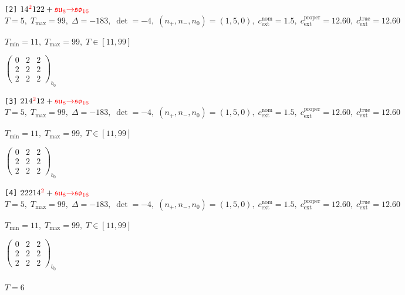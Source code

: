 \documentclass[10pt]{article}
\begin{document}
\texttt{[2]} $14^{\textcolor{red}{2}}122 + \textcolor{red}{\mathfrak{su}_8{\to}\mathfrak{so}_{16}}$ \quad $T=5,\;T_{\max}=99,\;\Delta=-183,\;\det=-4,\;(n_+,n_-,n_0)=(1,5,0),\;c_\mathrm{ext}^{\mathrm{nom}}=1.5,\;c_\mathrm{ext}^{\mathrm{proper}}=12.60,\;c_\mathrm{ext}^{\mathrm{true}}=12.60$

\hspace{1em}$T_{\min}=11,\;T_{\max}=99,\;T\in[11,99]$

\hspace{2em}$\left(\begin{smallmatrix}0 & 2 & 2 \\ 2 & 2 & 2 \\ 2 & 2 & 2\end{smallmatrix}\right)_{\!b_0}$

\texttt{[3]} $214^{\textcolor{red}{2}}12 + \textcolor{red}{\mathfrak{su}_8{\to}\mathfrak{so}_{16}}$ \quad $T=5,\;T_{\max}=99,\;\Delta=-183,\;\det=-4,\;(n_+,n_-,n_0)=(1,5,0),\;c_\mathrm{ext}^{\mathrm{nom}}=1.5,\;c_\mathrm{ext}^{\mathrm{proper}}=12.60,\;c_\mathrm{ext}^{\mathrm{true}}=12.60$

\hspace{1em}$T_{\min}=11,\;T_{\max}=99,\;T\in[11,99]$

\hspace{2em}$\left(\begin{smallmatrix}0 & 2 & 2 \\ 2 & 2 & 2 \\ 2 & 2 & 2\end{smallmatrix}\right)_{\!b_0}$

\texttt{[4]} $22214^{\textcolor{red}{2}} + \textcolor{red}{\mathfrak{su}_8{\to}\mathfrak{so}_{16}}$ \quad $T=5,\;T_{\max}=99,\;\Delta=-183,\;\det=-4,\;(n_+,n_-,n_0)=(1,5,0),\;c_\mathrm{ext}^{\mathrm{nom}}=1.5,\;c_\mathrm{ext}^{\mathrm{proper}}=12.60,\;c_\mathrm{ext}^{\mathrm{true}}=12.60$

\hspace{1em}$T_{\min}=11,\;T_{\max}=99,\;T\in[11,99]$

\hspace{2em}$\left(\begin{smallmatrix}0 & 2 & 2 \\ 2 & 2 & 2 \\ 2 & 2 & 2\end{smallmatrix}\right)_{\!b_0}$

\paragraph{$T=6$}
\end{document}
